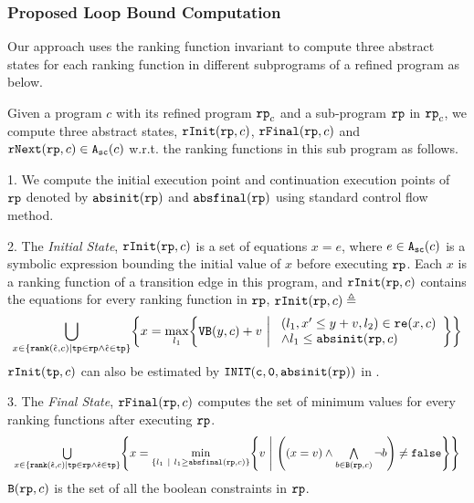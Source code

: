 \subsubsection{Proposed Loop Bound Computation} 
\label{sec:loopbound-absstate}
Our approach uses the ranking function invariant to compute 
three abstract states for each ranking function in different subprograms of a refined program as below.
\begin{defn}
 \label{def:alg-absstate}
 Given a program $c$ with its refined program $\mathtt{rp}_c$ and a sub-program $\mathtt{rp}$ in $\mathtt{rp}_c$,
 we compute three abstract states, $\mathtt{rInit}(\mathtt{rp}, c)$, $\mathtt{rFinal}(\mathtt{rp}, c)$ and $\mathtt{rNext}(\mathtt{rp}, c) \in {\ensuremath{\mathtt{A_{sc}}}}(c)$ w.r.t. the ranking functions in this sub program as follows.
 
 1. We compute the initial execution point and continuation execution points of $\mathtt{rp}$ denoted by
 $\mathtt{abs}{\mathtt{init}}(\mathtt{rp})$
 and 
 $\mathtt{abs}{\mathtt{final}}(\mathtt{rp})$ using standard control flow method.
 
2. The \emph{Initial State}, 
 $\mathtt{rInit}(\mathtt{rp}, c)$ is a set of equations $x = e$, where $e \in {\ensuremath{\mathtt{A_{sc}}}}(c)$ is a
 symbolic expression bounding the initial value of $x$ before executing $\mathtt{rp}$.
 Each $x$ is a ranking function of a transition edge in this program, and $\mathtt{rInit}(\mathtt{rp}, c)$ contains the equations for every ranking function in $\mathtt{rp}$,
 $\mathtt{rInit}(\mathtt{rp}, c) \triangleq $
 {\small
 \[
 \bigcup_{x \in \left\{ \rank(\absevent, c) | \tpath \in \rprog \land \absevent \in \tpath \right\} }
 \left \{ 
 x = \max_{l_1}\left\{
 \varinvar(y, c) + v ~\middle\vert~ 
 \begin{array}{l} 
 (l_1, x' \leq y + v, l_2) \in \reset(x, c) 
 \\
 \land l_1 \leq \absinit(\rprog, c)
 \end{array}
 \right\}
 \right\}
 \]
 }
 $\mathtt{rInit}(\mathtt{tp}, c)$ can also be estimated by $\mathtt{INIT(c, 0, \mathtt{abs}{\mathtt{init}}(\mathtt{rp}))}$ in \cite{GulwaniJK09}. 

 3. The \emph{Final State}, $\mathtt{rFinal}(\mathtt{rp}, c)$ computes the set of minimum values for every ranking functions
 after executing $\mathtt{rp}$.
 {\small
\[
 \begin{array}{l} 
 \bigcup\limits_{x \in \left\{ \rank(\absevent, c) | \tpath \in \rprog \land \absevent \in \tpath \right\} }
 \left \{ 
 x = \min\limits_{ \left\{ l_1 ~|~ l_1 \geq \absfinal(\rprog, c) \right\} }
 \left\{
 v ~\middle\vert~ 
 \left( (x = v) \land \bigwedge\limits_{b \in \kw{B}(\rprog, c)} \neg b \right) \neq \efalse
 \right\}
 \right\}
 \end{array}
 \]
 }
 $\mathtt{B}(\mathtt{rp}, c)$ is the set of all the boolean constraints in $\mathtt{rp}$.


\end{defn}
